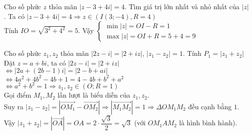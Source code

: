 \begin{bt}%
	Cho số phức $z$ thỏa mãn $\left|z-3+4i \right|=4$. Tìm giá trị lớn nhất và nhỏ nhất của $\left|z \right|$.
	\loigiai
	{
		Ta có $\left|z-3+4i \right|=4\Rightarrow z\in \left(I\left(3;-4 \right),R=4 \right)$\\
		Tính $IO=\sqrt{3^2+4^2}=5$. Vậy $\begin{cases}\min\left|z \right|=OI-R=1 \\ \max\left|z \right|=OI+R=5+4=9 \end{cases}$
	}
\end{bt} 

\begin{bt}%
	Cho số phức $z_1, z_2$ thỏa mãn $\left|2z-i \right|=\left|2+iz \right|$, $\left|z_1-z_2 \right|=1$. Tính $P_1=\left|z_1+z_2 \right|$
	\loigiai 
	{
		Đặt $z=a+bi$, ta có $\left|2z-i \right|=\left|2+iz \right|$\\
		$\Leftrightarrow\left|2a+\left(2b-1 \right)i \right|=\left|2-b+ai \right|$\\
		$\Leftrightarrow 4a^2+4b^2-4b+1=4-4b+b^2+a^2$\\
		$\Leftrightarrow a^2+b^2=1\Rightarrow z_1,z_2\in \left(O;R=1 \right)$\\
		Gọi điểm $M_1,M_2$ lần lượt là biểu diễn của $z_1,z_2$. \\
		Suy ra $\left|z_1-z_2 \right|=\left|\overrightarrow{OM_1}-\overrightarrow{OM_2} \right|\Rightarrow \left|\overrightarrow{M_1M_2} \right|=1\Rightarrow \Delta OM_1M_2$ đều cạnh bằng $1$.\\
		Vậy $\left|z_1+z_2 \right|=\left|\overrightarrow{OA} \right|=OA=2\cdot\dfrac{\sqrt{3}}{2}=\sqrt{3}$ (với $OM_1AM_2$ là hình bình hành).
	}
\end{bt} 


